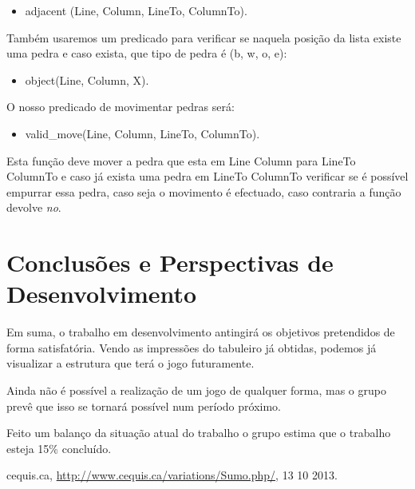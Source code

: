 \documentclass[a4paper]{article}
\begin{document}
\begin{itemize}
\item adjacent (Line, Column, LineTo, ColumnTo).
\end{itemize}

Também usaremos um predicado para verificar se naquela posição da lista existe uma pedra e caso exista, que tipo de pedra é (b, w, o, e):
\begin{itemize}
\item object(Line, Column, X).
\end{itemize}
O nosso predicado de movimentar pedras será:

\begin{itemize}
\item valid\_move(Line, Column, LineTo, ColumnTo).
\end{itemize}

Esta função deve mover a pedra que esta em Line Column para LineTo ColumnTo e caso já exista uma pedra em LineTo ColumnTo verificar se é possível empurrar essa pedra, caso seja o movimento é efectuado, caso contraria a função devolve \textit{no}.


\section{Conclusões e Perspectivas de Desenvolvimento}
Em suma, o trabalho em desenvolvimento antingirá os objetivos pretendidos de forma satisfatória.
Vendo as impressões do tabuleiro já obtidas, podemos já visualizar a estrutura que terá o jogo futuramente.

Ainda não é possível a realização de um jogo de qualquer forma, mas o grupo prevê que isso se tornará possível num período próximo.

Feito um balanço da situação atual do trabalho o grupo estima que o trabalho esteja 15\% concluído.

\clearpage
{}
\renewcommand\refname{Bibliografia}

\begin{thebibliography}{9}

  cequis.ca,
  \url{http://www.cequis.ca/variations/Sumo.php/},
  13 10 2013.

\end{thebibliography}

\newpage
\appendix
\end{document}
